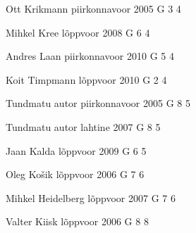 \documentclass[11pt]{article}
\begin{document}
{Ott Krikmann} %
{piirkonnavoor} %
{2005} %
{G 3} %
{4} %
{

\ifEngHint
\fi
}

{Mihkel Kree} %
{lõppvoor} %
{2008} %
{G 6} %
{4} %
{

\ifEngHint
\fi
}

{Andres Laan} %
{piirkonnavoor} %
{2010} %
{G 5} %
{4} %
{

\ifEngHint
\fi
}

{Koit Timpmann} %
{lõppvoor} %
{2010} %
{G 2} %
{4} %
{

\ifEngHint
\fi
}

{Tundmatu autor} %
{piirkonnavoor} %
{2005} %
{G 8} %
{5} %
{

\ifEngHint
\fi
}

{Tundmatu autor} %
{lahtine} %
{2007} %
{G 8} %
{5} %
{

\ifEngHint
\fi
}

{Jaan Kalda} %
{lõppvoor} %
{2009} %
{G 6} %
{5} %
{

\ifEngHint
\fi
}

{Oleg Košik} %
{lõppvoor} %
{2006} %
{G 7} %
{6} %
{

\ifEngHint
\fi
}

{Mihkel Heidelberg} %
{lõppvoor} %
{2007} %
{G 7} %
{6} %
{

\ifEngHint
\fi
}

{Valter Kiisk} %
{lõppvoor} %
{2006} %
{G 8} %
{8} %
{

\ifEngHint
\fi
}
\end{document}

